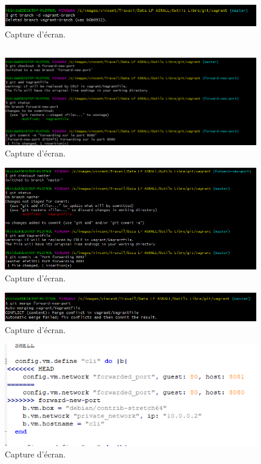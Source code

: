 \documentclass{article}
\begin{document}
\begin{figure}[h]
\centering
\includegraphics[width=\textwidth]{images/q3-2-7.png}
\caption{\label{fig:frog}Capture d'écran.}
\end{figure}
\FloatBarrier
\subsection{}

\begin{figure}[h]
\centering
\includegraphics[width=\textwidth]{images/q3-3-1.png}
\caption{\label{fig:frog}Capture d'écran.}
\end{figure}

\begin{figure}[h]
\centering
\includegraphics[width=\textwidth]{images/q3-3-2.png}
\caption{\label{fig:frog}Capture d'écran.}
\end{figure}

\begin{figure}[h]
\centering
\includegraphics[width=\textwidth]{images/q3-3-3.png}
\caption{\label{fig:frog}Capture d'écran.}
\end{figure}

\begin{figure}[h]
\centering
\includegraphics[width=\textwidth]{images/q3-3-4.png}
\caption{\label{fig:frog}Capture d'écran.}
\end{figure}



\end{document}
